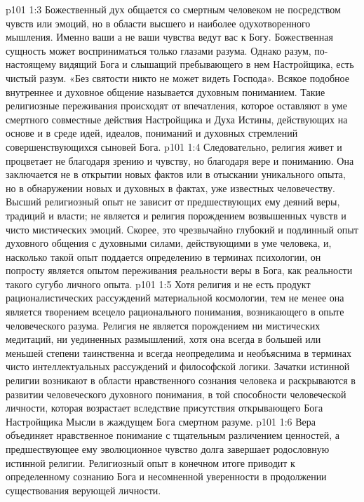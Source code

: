 \vs p101 1:3 Божественный дух общается со смертным человеком не посредством чувств или эмоций, но в области высшего и наиболее одухотворенного мышления. Именно ваши  а не ваши чувства ведут вас к Богу. Божественная сущность может восприниматься только глазами разума. Однако разум, по\hyp{}настоящему видящий Бога и слышащий пребывающего в нем Настройщика, есть чистый разум. «Без святости никто не может видеть Господа». Всякое подобное внутреннее и духовное общение называется духовным пониманием. Такие религиозные переживания происходят от впечатления, которое оставляют в уме смертного совместные действия Настройщика и Духа Истины, действующих на основе и в среде идей, идеалов, пониманий и духовных стремлений совершенствующихся сыновей Бога.
\vs p101 1:4 Следовательно, религия живет и процветает не благодаря зрению и чувству, но благодаря вере и пониманию. Она заключается не в открытии новых фактов или в отыскании уникального опыта, но в обнаружении новых и духовных  в фактах, уже известных человечеству. Высший религиозный опыт не зависит от предшествующих ему деяний веры, традиций и власти; не является и религия порождением возвышенных чувств и чисто мистических эмоций. Скорее, это чрезвычайно глубокий и подлинный опыт духовного общения с духовными силами, действующими в уме человека, и, насколько такой опыт поддается определению в терминах психологии, он попросту является опытом переживания реальности веры в Бога, как реальности такого сугубо личного опыта.
\vs p101 1:5 \pc Хотя религия и не есть продукт рационалистических рассуждений материальной космологии, тем не менее она является творением всецело рационального понимания, возникающего в опыте человеческого разума. Религия не является порождением ни мистических медитаций, ни уединенных размышлений, хотя она всегда в большей или меньшей степени таинственна и всегда неопределима и необъяснима в терминах чисто интеллектуальных рассуждений и философской логики. Зачатки истинной религии возникают в области нравственного сознания человека и раскрываются в развитии человеческого духовного понимания, в той способности человеческой личности, которая возрастает вследствие присутствия открывающего Бога Настройщика Мысли в жаждущем Бога смертном разуме.
\vs p101 1:6 Вера объединяет нравственное понимание с тщательным различением ценностей, а предшествующее ему эволюционное чувство долга завершает родословную истинной религии. Религиозный опыт в конечном итоге приводит к определенному сознанию Бога и несомненной уверенности в продолжении существования верующей личности.
